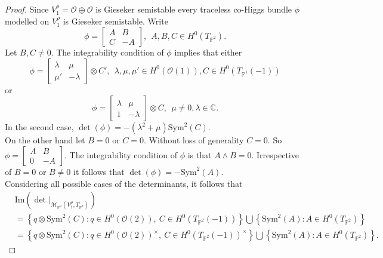 \documentclass[12pt]{amsart}
\theoremstyle{definition}
\theoremstyle{remark}
\numberwithin{equation}{section}
\begin{document}
\begin{proof}
Since $V_1^\rho = \mathcal{O}\oplus\mathcal{O}$ is Gieseker semistable every traceless co-Higgs bundle $\phi$ modelled on $V_1^\rho$ is Gieseker semistable. Write 
\begin{equation}
\phi = \begin{bmatrix}
  A & B\\
    C & -A
\end{bmatrix},~~ A, B, C\in H^0(T_{\mathbb{P}^2}). 
\end{equation}
Let $B, C\neq 0$. The integrability condition of $\phi$ implies that either 
\begin{equation}
\phi = \begin{bmatrix}
    \lambda & \mu\\
    \mu' & -\lambda
\end{bmatrix}\otimes C',~~ \lambda, \mu, \mu'\in H^0(\mathcal{O}(1)), C\in H^0(T_{\mathbb{P}^1}(-1))
\end{equation}
or 
\begin{equation}
\phi = \begin{bmatrix}
    \lambda & \mu\\
    1 & -\lambda
\end{bmatrix}\otimes C ,~~\mu\neq 0, \lambda\in\mathbb{C}.
\end{equation}
In the second case, $\det(\phi) = -(\lambda^2 + \mu)\mbox{Sym}^2(C)$. \\

On the other hand let $B = 0$ or $C = 0$. Without loss of generality $C=0$. So $\phi = \begin{bmatrix}
    A & B\\
    0 & -A
\end{bmatrix}.$ The integrability condition of $\phi$ is that $A\wedge B = 0$. Irrespective of $B=0$ or $B\neq 0$ it follows that $\det(\phi) = -\mbox{Sym}^2(A)$.\\

Considering all possible cases of the determinants, it follows that \begin{align*}
&\mbox{Im}\left(\det|_{\mathcal{M}_{\mathbb{P}^2}(V_1^\rho, T_{\mathbb{P}^2})}\right)\\
&= \left\{q\otimes\mbox{Sym}^2(C): q\in H^0(\mathcal{O}(2)),~ C\in H^0(T_{\mathbb{P}^2}(-1))\right\}\bigcup \left\{\mbox{Sym}^2(A): A\in H^0(T_{\mathbb{P}^2})\right\}\\
&= \left\{q\otimes\mbox{Sym}^2(C): q\in H^0(\mathcal{O}(2))^\times,~ C\in H^0(T_{\mathbb{P}^2}(-1))^\times\right\}\bigcup \left\{\mbox{Sym}^2(A): A\in H^0(T_{\mathbb{P}^2})\right\}.
\end{align*}


\end{proof}
\end{document}
